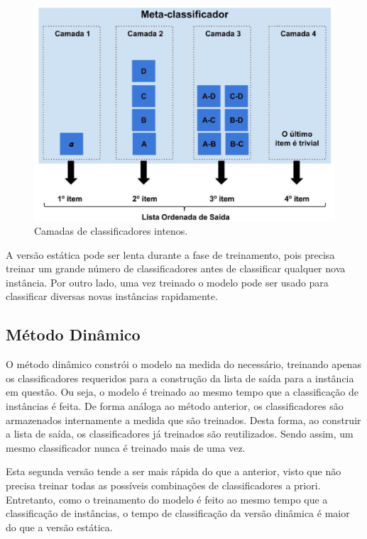 \begin{figure}[h!]
  \includegraphics[width=\linewidth]{images/metodoproposto03.eps}
  \caption{Camadas de classificadores intenos.}
  \label{fig:metodoproposto03}
\end{figure}

A versão estática pode ser lenta durante a fase de treinamento, pois precisa treinar um grande número de classificadores antes de classificar qualquer nova instância. Por outro lado, uma vez treinado o modelo pode ser usado para classificar diversas novas instâncias rapidamente.

\subsection{Método Dinâmico}

O método dinâmico constrói o modelo na medida do necessário, treinando apenas os classificadores requeridos para a construção da lista de saída para a instância em questão. Ou seja, o modelo é treinado ao mesmo tempo que a classificação de instâncias é feita. De forma análoga ao método anterior, os classificadores são armazenados internamente a medida que são treinados. Desta forma, ao construir a lista de saída, os classificadores já treinados são reutilizados. Sendo assim, um mesmo classificador nunca é treinado mais de uma vez. 

Esta segunda versão tende a ser mais rápida do que a anterior, visto que não precisa treinar todas as possíveis combinações de classificadores a priori. Entretanto, como o treinamento do modelo é feito ao mesmo tempo que a classificação de instâncias, o tempo de classificação da versão dinâmica é maior do que a versão estática. 

